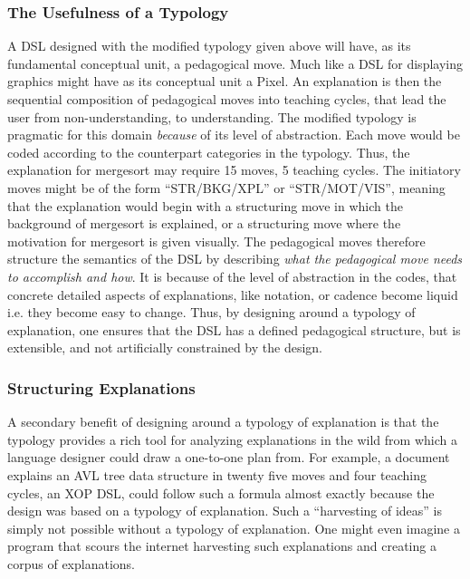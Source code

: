 \documentclass[conference]{IEEEtran}
\begin{document}
\subsubsection{The Usefulness of a Typology}
A DSL designed with the modified typology given above will have, as its
fundamental conceptual unit, a pedagogical move. Much like a DSL for displaying
graphics might have as its conceptual unit a Pixel. An explanation is then the
sequential composition of pedagogical moves into teaching cycles, that lead the
user from non-understanding, to understanding. The modified typology is
pragmatic for this domain \emph{because} of its level of abstraction. Each move
would be coded according to the counterpart categories in the typology. Thus,
the explanation for mergesort may require 15 moves, 5 teaching cycles. The
initiatory moves might be of the form ``STR/BKG/XPL'' or ``STR/MOT/VIS'',
meaning that the explanation would begin with a structuring move in which the
background of mergesort is explained, or a structuring move where the motivation
for mergesort is given visually. The pedagogical moves therefore structure the
semantics of the DSL by describing \emph{what the pedagogical move needs to
  accomplish and how}. It is because of the level of abstraction in the codes,
that concrete detailed aspects of explanations, like notation, or cadence become
liquid i.e. they become easy to change. Thus, by designing around a typology of
explanation, one ensures that the DSL has a defined pedagogical structure, but
is extensible, and not artificially constrained by the design.

\subsubsection{Structuring Explanations}
A secondary benefit of designing around a typology of explanation is that the
typology provides a rich tool for analyzing explanations in the wild from which
a language designer could draw a one-to-one plan from. For example, a document
explains an AVL tree data structure in twenty five moves and four teaching
cycles, an XOP DSL, could follow such a formula almost exactly because the
design was based on a typology of explanation. Such a ``harvesting of ideas'' is
simply not possible without a typology of explanation. One might even imagine a
program that scours the internet harvesting such explanations and creating a
corpus of explanations.
\end{document}

